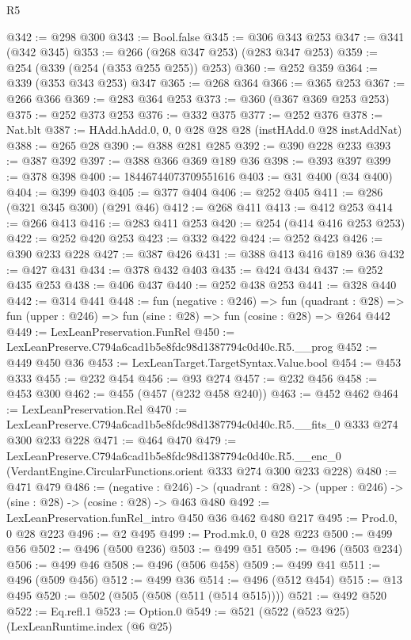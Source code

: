 \begin{lexlean}{R5}
\begin{coremodule}
@342 := @298 @300
@343 := Bool.false
@345 := @306 @343 @253
@347 := @341 (@342 @345)
@353 := @266 (@268 @347 @253) (@283 @347 @253)
@359 := @254 (@339 (@254 (@353 @255 @255)) @253)
@360 := @252 @359
@364 := @339 (@353 @343 @253) @347
@365 := @268 @364
@366 := @365 @253
@367 := @266 @366
@369 := @283 @364 @253
@373 := @360 (@367 @369 @253 @253)
@375 := @252 @373 @253
@376 := @332 @375
@377 := @252 @376
@378 := Nat.blt
@387 := HAdd.hAdd.{0, 0, 0} @28 @28 @28 (instHAdd.{0} @28 instAddNat)
@388 := @265 @28
@390 := @388 @281 @285
@392 := @390 @228 @233
@393 := @387 @392
@397 := @388 @366 @369 @189 @36
@398 := @393 @397
@399 := @378 @398
@400 := 18446744073709551616
@403 := @31 @400 (@34 @400)
@404 := @399 @403
@405 := @377 @404
@406 := @252 @405
@411 := @286 (@321 @345 @300) (@291 @46)
@412 := @268 @411
@413 := @412 @253
@414 := @266 @413
@416 := @283 @411 @253
@420 := @254 (@414 @416 @253 @253)
@422 := @252 @420 @253
@423 := @332 @422
@424 := @252 @423
@426 := @390 @233 @228
@427 := @387 @426
@431 := @388 @413 @416 @189 @36
@432 := @427 @431
@434 := @378 @432 @403
@435 := @424 @434
@437 := @252 @435 @253
@438 := @406 @437
@440 := @252 @438 @253
@441 := @328 @440
@442 := @314 @441
@448 := fun (negative : @246) =>
  fun (quadrant : @28) => fun (upper : @246) => fun (sine : @28) => fun (cosine : @28) => @264 @442
@449 := LexLeanPreservation.FunRel
@450 := LexLeanPreserve.C794a6cad1b5e8fdc98d1387794c0d40c.R5.__prog
@452 := @449 @450 @36
@453 := LexLeanTarget.TargetSyntax.Value.bool
@454 := @453 @333
@455 := @232 @454
@456 := @93 @274
@457 := @232 @456
@458 := @453 @300
@462 := @455 (@457 (@232 @458 @240))
@463 := @452 @462
@464 := LexLeanPreservation.Rel
@470 := LexLeanPreserve.C794a6cad1b5e8fdc98d1387794c0d40c.R5.__fits_0 @333 @274 @300 @233 @228
@471 := @464 @470
@479 := LexLeanPreserve.C794a6cad1b5e8fdc98d1387794c0d40c.R5.__enc_0
    (VerdantEngine.CircularFunctions.orient @333 @274 @300 @233 @228)
@480 := @471 @479
@486 := (negative : @246) ->
  (quadrant : @28) -> (upper : @246) -> (sine : @28) -> (cosine : @28) -> @463 @480
@492 := LexLeanPreservation.funRel_intro @450 @36 @462 @480 @217
@495 := Prod.{0, 0} @28 @223
@496 := @2 @495
@499 := Prod.mk.{0, 0} @28 @223
@500 := @499 @56
@502 := @496 (@500 @236)
@503 := @499 @51
@505 := @496 (@503 @234)
@506 := @499 @46
@508 := @496 (@506 @458)
@509 := @499 @41
@511 := @496 (@509 @456)
@512 := @499 @36
@514 := @496 (@512 @454)
@515 := @13 @495
@520 := @502 (@505 (@508 (@511 (@514 @515))))
@521 := @492 @520
@522 := Eq.refl.{1}
@523 := Option.{0}
@549 := @521
    (@522
      (@523 @25)
      (LexLeanRuntime.index
        (@6 @25)

\end{coremodule}
\end{lexlean}
